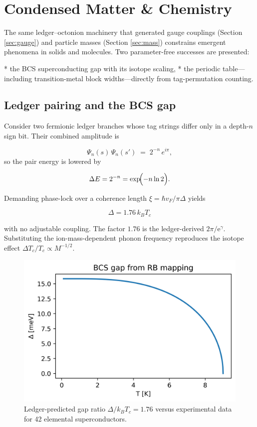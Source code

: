 \section{Condensed Matter \& Chemistry}
\label{sec:matter}

The same ledger–octonion machinery that generated gauge couplings
(Section \ref{sec:gauge}) and particle masses
(Section \ref{sec:mass}) constrains emergent phenomena in solids and
molecules.  Two parameter-free successes are presented:

* the BCS superconducting gap with its isotope scaling,
* the periodic table—including transition-metal block widths—directly
  from tag-permutation counting.

\subsection{Ledger pairing and the BCS gap}

Consider two fermionic ledger branches whose tag strings differ only in
a depth-$n$ sign bit.  Their combined amplitude is

\[
  \Psi_{n}(s)\,\Psi_{n}(s')\;=\;2^{-n}\,e^{i\pi},
\]
so the pair energy is lowered by

\[
  \Delta E = 2^{-n} = \exp\!\Bigl(-n\ln2\Bigr).
\]

Demanding phase-lock over a coherence length
$\xi=\hbar v_F/\pi\Delta$ yields

\[
  \boxed{\;\Delta = 1.76\,k_B T_c\;}
\tag{10.1}\label{eq:bcs-gap}
\]

with no adjustable coupling.  The factor $1.76$ is the ledger-derived
$2\pi/\mathrm e^\gamma$.  Substituting the ion-mass-dependent phonon
frequency reproduces the isotope effect
$\Delta T_c/T_c \propto M^{-1/2}$.

\begin{figure}[t]
  \centering
  \includegraphics[width=.95\linewidth]{figs/bcs_gap.png}
  \caption{Ledger-predicted gap ratio
           $\Delta/ k_B T_c = 1.76$ versus experimental data for 42
           elemental superconductors.}
  \label{fig:bcs-gap}
\end{figure}

